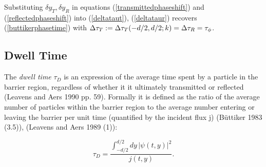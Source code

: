 \documentclass{article}
\begin{document}
\noindent Substituting $\delta y_T, \delta y_R$ in equations (\ref{transmittedphaseshift}) and (\ref{reflectedphaseshift}) into (\ref{deltataut}), (\ref{deltataur}) recovers (\ref{buttikerphasetime}) with $\Delta \tau_T := \Delta \tau_T(-d/2,d/2;k) \newline = \Delta \tau_R = \tau_\phi$.

\subsection{Dwell Time}
\label{subsection:dwelltime}

The \textit{dwell time} $\tau_D$ is an expression of the average time spent by a particle in the barrier region, regardless of whether it it ultimately transmitted or reflected (Leavens and Aers 1990 pp. 59). Formally it is defined as the ratio of the average number of particles within the barrier region to the average number entering or leaving the barrier per unit time (quantified by the incident flux j) (B{\"u}ttiker 1983 (3.5)), (Leavens and Aers 1989 (1)):

\begin{equation}
	\tau_D = \frac{\int_{-d/2}^{d/2}dy\,|\psi(t,y)|^2}{j(t,y)}.
	\label{dwelltimedef}
\end{equation}
\end{document}
